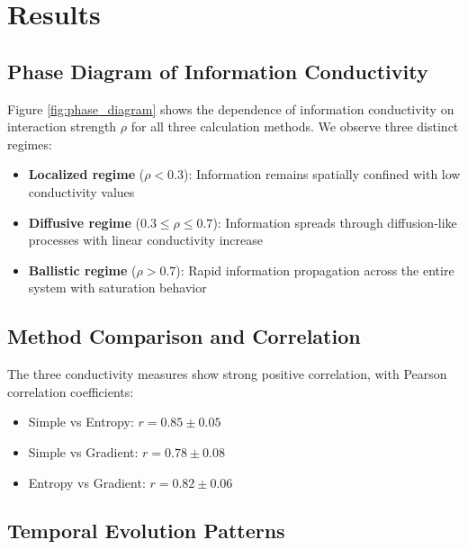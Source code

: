 \documentclass[twocolumn,showpacs,preprintnumbers,amsmath,amssymb,prb]{revtex4-2}
\newcommand{\rhointer}{\rho}
\begin{document}
\section{Results}
\label{sec:results}

\subsection{Phase Diagram of Information Conductivity}
\label{sec:phase_diagram}


Figure \ref{fig:phase_diagram} shows the dependence of information conductivity on interaction strength $\rhointer$ for all three calculation methods. We observe three distinct regimes:

\begin{itemize}
\item \textbf{Localized regime} ($\rhointer < 0.3$): Information remains spatially confined with low conductivity values
\item \textbf{Diffusive regime} ($0.3 \leq \rhointer \leq 0.7$): Information spreads through diffusion-like processes with linear conductivity increase
\item \textbf{Ballistic regime} ($\rhointer > 0.7$): Rapid information propagation across the entire system with saturation behavior
\end{itemize}

\subsection{Method Comparison and Correlation}
\label{sec:method_comparison}


The three conductivity measures show strong positive correlation, with Pearson correlation coefficients:
\begin{itemize}
\item Simple vs Entropy: $r = 0.85 \pm 0.05$
\item Simple vs Gradient: $r = 0.78 \pm 0.08$
\item Entropy vs Gradient: $r = 0.82 \pm 0.06$
\end{itemize}

\subsection{Temporal Evolution Patterns}
\label{sec:temporal_evolution}
\end{document}
